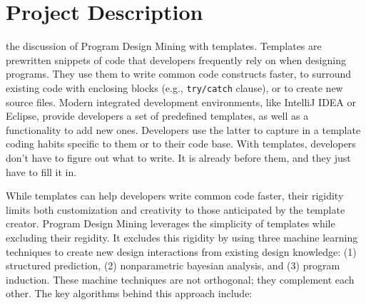 \chapter{Project Description}{}
\label{sec:related}

 the discussion of Program Design Mining with templates. 
Templates are prewritten snippets of code that developers frequently rely on when 
designing programs. They use them to write common code constructs faster, to 
surround existing code with enclosing blocks (e.g., \texttt{try/catch} clause), or to 
create new source files. Modern integrated development environments, like IntelliJ IDEA 
or Eclipse, provide developers a set of predefined templates, as well as a functionality 
to add new ones. Developers use the latter to capture in a template coding habits 
specific to them or to their code base. With templates, developers don't have to figure 
out what to write. It is already before them, and they just have to fill it in.  

While templates can help developers write common code faster, their rigidity limits 
both customization and creativity to those anticipated by the template creator. 
Program Design Mining leverages the simplicity of templates while excluding their 
regidity. It excludes this rigidity by using three machine learning techniques 
to create new design interactions from existing design knowledge: (1) structured 
prediction, (2) nonparametric bayesian analysis, and (3) program induction. These 
machine techniques are not orthogonal; they complement each other. The key algorithms 
behind this approach include:


%
%
%
%
%
%

